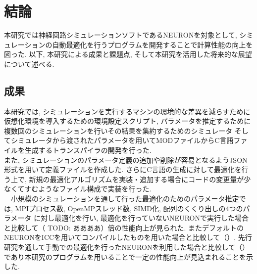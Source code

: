 \section{結論}
本研究では神経回路シミュレーションソフトであるNEURONを対象として,
シミュレーションの自動最適化を行うプログラムを開発することで計算性能の向上を図った.
以下, 本研究による成果と課題点, そして本研究を活用した将来的な展望について述べる.\\

\subsection{成果}
本研究では, シミュレーションを実行するマシンの環境的な差異を減らすために仮想化環境を導入するための環境設定スクリプト,
パラメータを推定するために複数回のシミュレーションを行いその結果を集約するためのシミュレータ
そしてシミュレータから渡されたパラメータを用いてMODファイルからC言語ファイルを生成するトランスパイラの開発を行った.\\
また, シミュレーションのパラメータ定義の追加や削除が容易となるようJSON形式を用いて定義ファイルを作成した.
さらにC言語の生成に対して最適化を行う上で, 新規の最適化アルゴリズムを実装・追加する場合にコードの変更量が少なくてすむようなファイル構成で実装を行った.\\
　小規模のシミュレーションを通して行った最適化のためのパラメータ推定では, MPIプロセス数, OpenMPスレッド数, SIMD化, 配列のくくり出しの4つのパラメータ
に対し最適化を行い, 最適化を行っていないNEURONで実行した場合と比較して（ TODO: ああああ）倍の性能向上が見られた.
またデフォルトのNEURONをICCを用いてコンパイルしたものを用いた場合と比較して（）,
先行研究を通して手動での最適化を行ったNEURONを利用した場合と比較して（）であり本研究のプログラムを用いることで一定の性能向上が見込まれることを示した.\\

